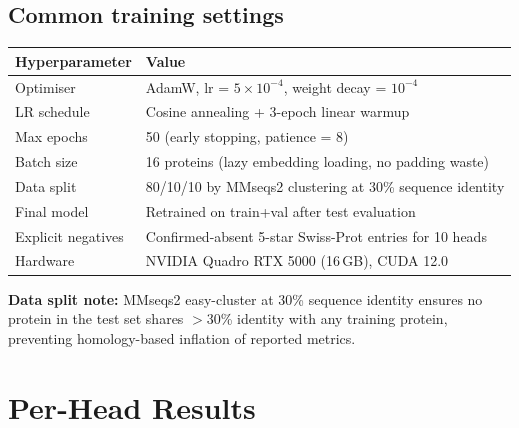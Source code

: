 \documentclass[11pt,a4paper]{article}
\begin{document}
\subsection{Common training settings}

\begin{tabular}{L{4.5cm} L{9.5cm}}
\toprule
\textbf{Hyperparameter} & \textbf{Value} \\
\midrule
Optimiser & AdamW, lr = $5\times10^{-4}$, weight decay = $10^{-4}$ \\
LR schedule & Cosine annealing + 3-epoch linear warmup \\
Max epochs & 50 (early stopping, patience = 8) \\
Batch size & 16 proteins (lazy embedding loading, no padding waste) \\
Data split & 80/10/10 by MMseqs2 clustering at 30\% sequence identity \\
Final model & Retrained on train+val after test evaluation \\
Explicit negatives & Confirmed-absent 5-star Swiss-Prot entries for 10 heads \\
Hardware & NVIDIA Quadro RTX 5000 (16\,GB), CUDA 12.0 \\
\bottomrule
\end{tabular}

\medskip
\noindent\textbf{Data split note:} MMseqs2 easy-cluster at 30\% sequence identity ensures no protein in the test set shares $>$30\% identity with any training protein, preventing homology-based inflation of reported metrics.

\section{Per-Head Results}
\end{document}
